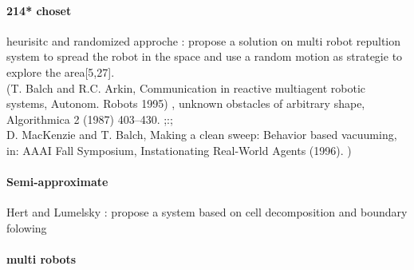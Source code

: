 		\paragraph{214* choset}
		heurisitc and randomized approche :  propose a solution  on multi robot repultion system to spread the  robot  in the space and  use   a random motion  as strategie to explore the area[5,27]. \\(T. Balch and R.C. Arkin, Communication in reactive multiagent robotic systems, Autonom. Robots 1995) , unknown obstacles of arbitrary shape, Algorithmica 2 (1987) 403–430. ;:;\\ D. MacKenzie and T. Balch, Making a clean sweep: Behavior based vacuuming, in: AAAI Fall Symposium, Instationating Real-World Agents (1996). )
		
		\paragraph{Semi-approximate}
		Hert and Lumelsky : propose a system based on cell decomposition  and   boundary folowing 
		
		\paragraph{multi robots}
		
		